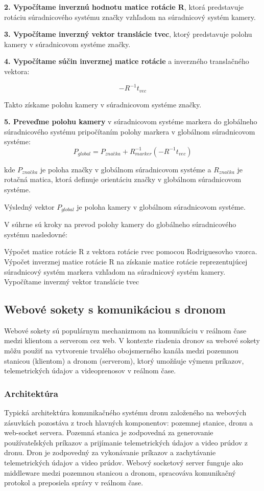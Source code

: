 {\textbf{2. Vypočítame inverznú hodnotu matice rotácie R}, ktorá predstavuje rotáciu súradnicového systému značky vzhľadom na súradnicový systém kamery.

\textbf{3. Vypočítame inverzný vektor translácie tvec}, ktorý predstavuje polohu kamery v súradnicovom systéme značky.

\textbf{4. Vypočítame súčin inverznej matice rotácie} a inverzného translačného vektora:

\begin{equation}
-R^{-1}t_{vec}
\end{equation}

Takto získame polohu kamery v súradnicovom systéme značky.

\textbf{5. Preveďme polohu kamery} v súradnicovom systéme markera do globálneho súradnicového systému pripočítaním polohy markera v globálnom súradnicovom systéme:
\begin{equation}
P_{global} = P_{značka} + R_{marker}^{-1}(-R^{-1}t_{vec})
\end{equation}

kde $P_{značka}$ je poloha značky v globálnom súradnicovom systéme a $R_{značka}$ je rotačná matica, ktorá definuje orientáciu značky v globálnom súradnicovom systéme.

Výsledný vektor $P_{global}$ je poloha kamery v globálnom súradnicovom systéme.

V súhrne sú kroky na prevod polohy kamery do globálneho súradnicového systému nasledovné:

Výpočet matice rotácie R z vektora rotácie rvec pomocou Rodriguesovho vzorca.
Výpočet inverznej matice rotácie R na získanie matice rotácie reprezentujúcej súradnicový systém markera vzhľadom na súradnicový systém kamery.
Vypočítame inverzný vektor translácie tvec


\subsection{Webové sokety s komunikáciou s dronom}
Webové sokety sú populárnym mechanizmom na komunikáciu v reálnom čase medzi klientom a serverom cez web. V kontexte riadenia dronov sa webové sokety môžu použiť na vytvorenie trvalého obojsmerného kanála medzi pozemnou stanicou (klientom) a dronom (serverom), ktorý umožňuje výmenu príkazov, telemetrických údajov a videoprenosov v reálnom čase.

\subsubsection{Architektúra}
Typická architektúra komunikačného systému dronu založeného na webových zásuvkách pozostáva z troch hlavných komponentov: pozemnej stanice, dronu a web-socket servera. Pozemná stanica je zodpovedná za generovanie používateľských príkazov a prijímanie telemetrických údajov a video prúdov z dronu. Dron je zodpovedný za vykonávanie príkazov a zachytávanie telemetrických údajov a video prúdov. Webový socketový server funguje ako middleware medzi pozemnou stanicou a dronom, spracováva komunikačný protokol a preposiela správy v reálnom čase.

}
